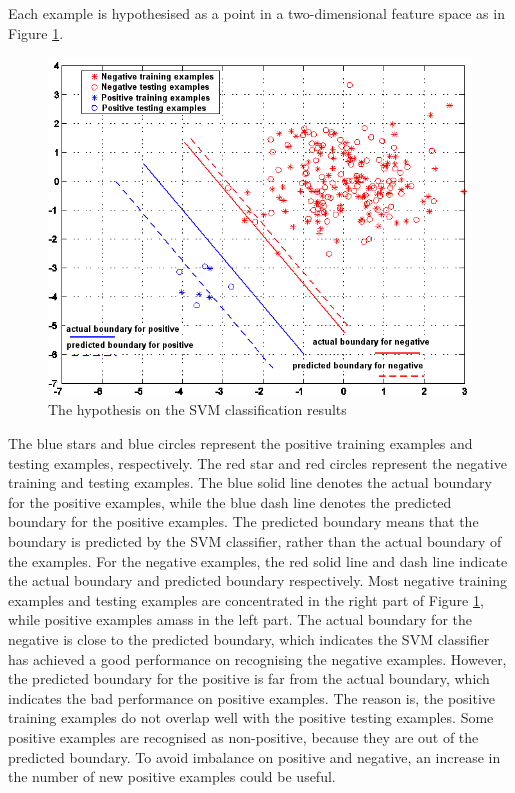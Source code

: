 Each example is hypothesised as a point in a two-dimensional feature space as in \mbox{Figure} \ref{fig:hypothesisSVM}. 
\begin{figure}[ht]
\begin{center}
 \includegraphics[width=\columnwidth]{ch4/figures/SVMresult.png}
\caption{The hypothesis on the SVM classification results}
\label{fig:hypothesisSVM}
\end{center}
\end{figure} 
The blue stars and blue circles represent the positive training examples and testing examples, respectively. The red star and red circles represent the negative training and testing examples. The blue solid line denotes the actual boundary for the positive examples, while the blue dash line denotes the predicted boundary for the positive examples. The predicted boundary means that the boundary is predicted by the SVM classifier, rather than the actual boundary of the examples. For the negative examples, the red solid line and dash line indicate the actual boundary and predicted boundary respectively. Most negative training examples and testing examples are concentrated in the right part of \mbox{Figure} \ref{fig:hypothesisSVM}, while positive examples amass in the left part. The actual boundary for the negative is close to the predicted boundary, which indicates the SVM classifier has achieved a good performance on recognising the negative examples. However, the predicted boundary for the positive is far from the actual boundary, which indicates the bad performance on positive examples. The reason is, the positive training examples do not overlap well with the positive testing examples. Some positive examples are recognised as non-positive, because they are out of the predicted boundary. To avoid imbalance on positive and negative, an increase in the number of new positive examples could be useful.

